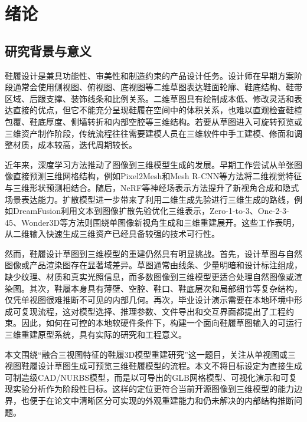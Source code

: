 
\chapter{绪论}

\section{研究背景与意义}

鞋履设计是兼具功能性、审美性和制造约束的产品设计任务。设计师在早期方案阶段通常会使用侧视图、俯视图、底视图等二维草图表达鞋面轮廓、鞋底结构、鞋带区域、后跟支撑、装饰线条和比例关系。二维草图具有绘制成本低、修改灵活和表达直接的优点，但它不能充分呈现鞋履在空间中的体积关系，也难以直观检查鞋楦包覆、鞋底厚度、侧墙转折和内部空腔等三维结构。若要从草图进入可旋转预览或三维资产制作阶段，传统流程往往需要建模人员在三维软件中手工建模、修面和调整材质，成本较高，迭代周期较长。

近年来，深度学习方法推动了图像到三维模型生成的发展。早期工作尝试从单张图像直接预测三维网格结构，例如Pixel2Mesh和Mesh R-CNN等方法将二维视觉特征与三维形状预测相结合\citep{wang2018pixel2mesh,gkioxari2019meshrcnn}。随后，NeRF等神经场表示方法提升了新视角合成和隐式场景表达能力\citep{mildenhall2020nerf}。扩散模型进一步带来了利用二维生成先验进行三维生成的路线，例如DreamFusion利用文本到图像扩散先验优化三维表示\citep{poole2022dreamfusion}，Zero-1-to-3、One-2-3-45、Wonder3D等方法则围绕单图像新视角生成和三维重建展开\citep{liu2023zero123,liu2023one2345,long2023wonder3d}。这些工作表明，从二维输入快速生成三维资产已经具备较强的技术可行性。

然而，鞋履设计草图到三维模型的重建仍然具有明显挑战。首先，设计草图与自然图像或产品渲染图存在显著域差异。草图通常由线条、少量明暗和设计标注组成，缺少纹理、材质和真实光照信息，而多数图像到三维模型更适合处理自然图像或渲染图。其次，鞋履本身具有薄壁、空腔、鞋口、鞋底层次和局部细节等复杂结构，仅凭单视图很难推断不可见的内部几何。再次，毕业设计演示需要在本地环境中形成可复现流程，这对模型选择、推理参数、文件导出和交互界面都提出了工程约束。因此，如何在可控的本地软硬件条件下，构建一个面向鞋履草图输入的可运行三维重建原型系统，具有实际的研究和工程意义。

本文围绕“融合三视图特征的鞋履3D模型重建研究”这一题目，关注从单视图或三视图鞋履设计草图生成可预览三维鞋履模型的流程。本文不将目标设定为直接生成可制造级CAD/NURBS模型，而是以可导出的GLB网格模型、可视化演示和可复现实验分析作为阶段性目标。这样的定位更符合当前开源图像到三维模型的能力边界，也便于在论文中清晰区分可实现的外观重建能力和仍未解决的内部结构推断问题。

